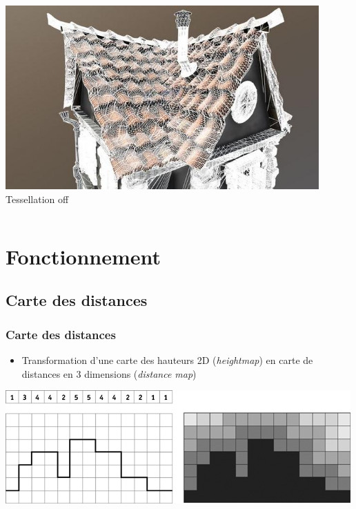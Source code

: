 \documentclass{beamer}
\begin{document}
\begin{frame}
\begin{columns}[t]
\begin{column}{0.5\textwidth}
            \includegraphics[width=0.9\textwidth]{images/tesselation_on_mesh}\\
            Tessellation off
        \end{column}
    \end{columns}
\end{frame}

\section{Fonctionnement}
\subsection{Carte des distances}
\begin{frame}
    \frametitle{Carte des distances}
    \begin{itemize}
        \item Transformation d'une carte des hauteurs 2D (\emph{heightmap}) en carte de distances en 3 dimensions (\emph{distance map})
    \end{itemize}
    \includegraphics[width=\textwidth]{images/sample_distancemap}
\end{frame}
\end{document}
